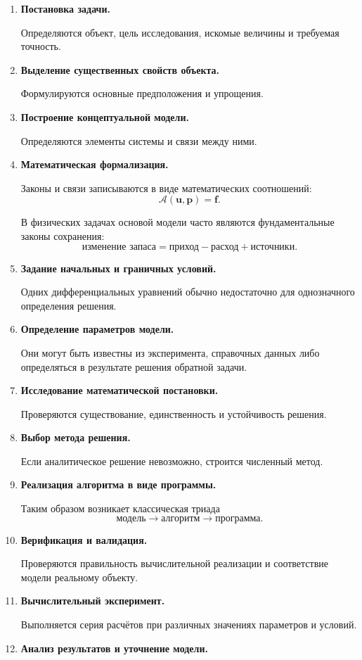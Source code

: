 \begin{enumerate}
	\item \textbf{Постановка задачи.}
	
	Определяются объект, цель исследования, искомые величины и требуемая точность.
	
	\item \textbf{Выделение существенных свойств объекта.}
	
	Формулируются основные предположения и упрощения.
	
	\item \textbf{Построение концептуальной модели.}
	
	Определяются элементы системы и связи между ними.
	
	\item \textbf{Математическая формализация.}
	
	Законы и связи записываются в виде математических соотношений:
	\[
	\mathcal{A}(\mathbf{u},\mathbf{p})=\mathbf{f}.
	\]
	
	В физических задачах основой модели часто являются фундаментальные
	законы сохранения:
	\[
	\text{изменение запаса}
	=
	\text{приход}
	-
	\text{расход}
	+
	\text{источники}.
	\]
	
	\item \textbf{Задание начальных и граничных условий.}
	
	Одних дифференциальных уравнений обычно недостаточно для однозначного
	определения решения.
	
	\item \textbf{Определение параметров модели.}
	
	Они могут быть известны из эксперимента, справочных данных либо определяться
	в результате решения обратной задачи.
	
	\item \textbf{Исследование математической постановки.}
	
	Проверяются существование, единственность и устойчивость решения.
	
	\item \textbf{Выбор метода решения.}
	
	Если аналитическое решение невозможно, строится численный метод.
	
	\item \textbf{Реализация алгоритма в виде программы.}
	
	Таким образом возникает классическая триада
	\[
	\boxed{\text{модель} \longrightarrow
		\text{алгоритм} \longrightarrow
		\text{программа}}.
	\]
	
	\item \textbf{Верификация и валидация.}
	
	Проверяются правильность вычислительной реализации и соответствие модели
	реальному объекту.
	
	\item \textbf{Вычислительный эксперимент.}
	
	Выполняется серия расчётов при различных значениях параметров и условий.
	
	\item \textbf{Анализ результатов и уточнение модели.}
\end{enumerate}

